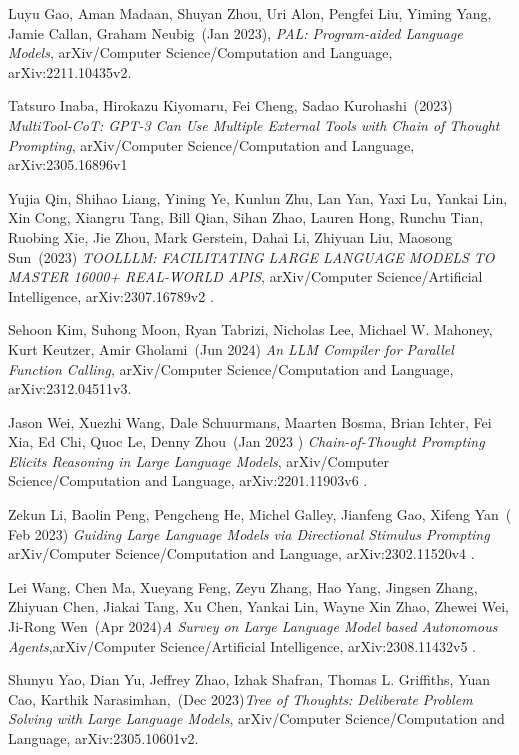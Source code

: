 \documentclass[conference]{IEEEtran}
\begin{document}
\begin{thebibliography}{00}
    Luyu Gao, Aman Madaan, Shuyan Zhou, Uri Alon, Pengfei Liu, Yiming Yang, Jamie Callan, Graham Neubig~(Jan 2023),
    {\it PAL: Program-aided Language Models},
    arXiv/Computer Science/Computation and Language,
    arXiv:2211.10435v2.

    Tatsuro Inaba, Hirokazu Kiyomaru, Fei Cheng, Sadao Kurohashi~(2023)
    {\it MultiTool-CoT: GPT-3 Can Use Multiple External Tools with Chain of
            Thought Prompting}, arXiv/Computer Science/Computation and Language,
    arXiv:2305.16896v1

    Yujia Qin, Shihao Liang, Yining Ye, Kunlun Zhu, Lan Yan, Yaxi Lu, Yankai Lin, Xin Cong, Xiangru Tang, Bill Qian, Sihan Zhao, Lauren Hong, Runchu Tian, Ruobing Xie, Jie Zhou, Mark Gerstein, Dahai Li, Zhiyuan Liu, Maosong Sun~(2023)
    {\it TOOLLLM: FACILITATING LARGE LANGUAGE
            MODELS TO MASTER 16000+ REAL-WORLD APIS}, arXiv/Computer Science/Artificial Intelligence,
    arXiv:2307.16789v2
    .

    Sehoon Kim, Suhong Moon, Ryan Tabrizi, Nicholas Lee, Michael W. Mahoney, Kurt Keutzer, Amir Gholami~(Jun 2024)
    {\it An LLM Compiler for Parallel Function Calling},
    arXiv/Computer Science/Computation and Language,
    arXiv:2312.04511v3.

    Jason Wei, Xuezhi Wang, Dale Schuurmans, Maarten Bosma, Brian Ichter, Fei Xia, Ed Chi, Quoc Le, Denny Zhou~(Jan 2023 )
    {\it Chain-of-Thought Prompting Elicits Reasoning
            in Large Language Models}, arXiv/Computer Science/Computation and Language,
    arXiv:2201.11903v6 .

    Zekun Li, Baolin Peng, Pengcheng He, Michel Galley, Jianfeng Gao, Xifeng Yan~( Feb 2023)
    {\it Guiding Large Language Models via
            Directional Stimulus Prompting}
    arXiv/Computer Science/Computation and Language,  arXiv:2302.11520v4 .

    Lei Wang, Chen Ma, Xueyang Feng, Zeyu Zhang, Hao Yang, Jingsen Zhang, Zhiyuan Chen, Jiakai Tang, Xu Chen, Yankai Lin, Wayne Xin Zhao, Zhewei Wei, Ji-Rong Wen~(Apr 2024){\it A Survey on Large Language Model based Autonomous
            Agents},arXiv/Computer Science/Artificial Intelligence, arXiv:2308.11432v5 .

    Shunyu Yao, Dian Yu, Jeffrey Zhao, Izhak Shafran, Thomas L. Griffiths, Yuan Cao, Karthik Narasimhan,~(Dec 2023){\it Tree of Thoughts: Deliberate Problem Solving
            with Large Language Models}, arXiv/Computer Science/Computation and Language,  arXiv:2305.10601v2.


\end{thebibliography}
\end{document}
